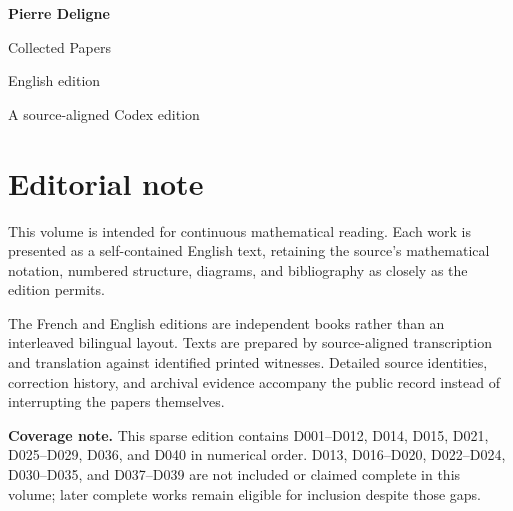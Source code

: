 \documentclass[11pt,a4paper]{article}
\begin{document}
\begin{titlepage}
  \pagecolor{DeligneBlue}
  \color{white}
  \vspace*{34mm}
  {\fontsize{30}{36}\selectfont\bfseries Pierre Deligne\par}
  \vspace{7mm}
  {\fontsize{18}{23}\selectfont Collected Papers\par}
  \vspace{4mm}
  {\large English edition\par}
  \vfill
  {\normalsize A source-aligned Codex edition\par}
\end{titlepage}
\setcounter{page}{2}
\nopagecolor
\color{DeligneInk}
\section*{Editorial note}
This volume is intended for continuous mathematical reading. Each work is presented as a self-contained English text, retaining the source's mathematical notation, numbered structure, diagrams, and bibliography as closely as the edition permits.

The French and English editions are independent books rather than an interleaved bilingual layout. Texts are prepared by source-aligned transcription and translation against identified printed witnesses. Detailed source identities, correction history, and archival evidence accompany the public record instead of interrupting the papers themselves.

\textbf{Coverage note.} This sparse edition contains D001--D012, D014, D015, D021, D025--D029, D036, and D040 in numerical order. D013, D016--D020, D022--D024, D030--D035, and D037--D039 are not included or claimed complete in this volume; later complete works remain eligible for inclusion despite those gaps.
\end{document}
